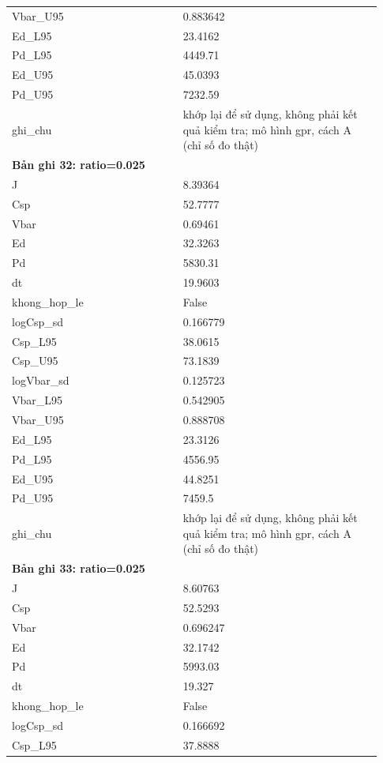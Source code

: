 \begin{longtable}{p{0.43\linewidth}p{0.50\linewidth}}
Vbar\_\allowbreak U95 & 0.883642 \\
Ed\_\allowbreak L95 & 23.4162 \\
Pd\_\allowbreak L95 & 4449.71 \\
Ed\_\allowbreak U95 & 45.0393 \\
Pd\_\allowbreak U95 & 7232.59 \\
ghi\_\allowbreak chu & khớp lại để sử dụng, không phải kết quả kiểm tra; mô hình gpr, cách A (chỉ số đo thật) \\
\midrule
\multicolumn{2}{p{0.95\linewidth}}{\textbf{Bản ghi 32: ratio=0.025}} \\
J & 8.39364 \\
Csp & 52.7777 \\
Vbar & 0.69461 \\
Ed & 32.3263 \\
Pd & 5830.31 \\
dt & 19.9603 \\
khong\_\allowbreak hop\_\allowbreak le & False \\
logCsp\_\allowbreak sd & 0.166779 \\
Csp\_\allowbreak L95 & 38.0615 \\
Csp\_\allowbreak U95 & 73.1839 \\
logVbar\_\allowbreak sd & 0.125723 \\
Vbar\_\allowbreak L95 & 0.542905 \\
Vbar\_\allowbreak U95 & 0.888708 \\
Ed\_\allowbreak L95 & 23.3126 \\
Pd\_\allowbreak L95 & 4556.95 \\
Ed\_\allowbreak U95 & 44.8251 \\
Pd\_\allowbreak U95 & 7459.5 \\
ghi\_\allowbreak chu & khớp lại để sử dụng, không phải kết quả kiểm tra; mô hình gpr, cách A (chỉ số đo thật) \\
\midrule
\multicolumn{2}{p{0.95\linewidth}}{\textbf{Bản ghi 33: ratio=0.025}} \\
J & 8.60763 \\
Csp & 52.5293 \\
Vbar & 0.696247 \\
Ed & 32.1742 \\
Pd & 5993.03 \\
dt & 19.327 \\
khong\_\allowbreak hop\_\allowbreak le & False \\
logCsp\_\allowbreak sd & 0.166692 \\
Csp\_\allowbreak L95 & 37.8888 \\

\end{longtable}
